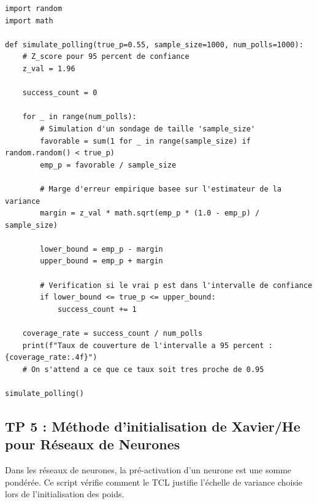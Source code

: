 \documentclass[11pt,a4paper]{article}
\begin{document}
\begin{lstlisting}
import random
import math

def simulate_polling(true_p=0.55, sample_size=1000, num_polls=1000):
    # Z_score pour 95 percent de confiance
    z_val = 1.96

    success_count = 0

    for _ in range(num_polls):
        # Simulation d'un sondage de taille 'sample_size'
        favorable = sum(1 for _ in range(sample_size) if random.random() < true_p)
        emp_p = favorable / sample_size

        # Marge d'erreur empirique basee sur l'estimateur de la variance
        margin = z_val * math.sqrt(emp_p * (1.0 - emp_p) / sample_size)

        lower_bound = emp_p - margin
        upper_bound = emp_p + margin

        # Verification si le vrai p est dans l'intervalle de confiance
        if lower_bound <= true_p <= upper_bound:
            success_count += 1

    coverage_rate = success_count / num_polls
    print(f"Taux de couverture de l'intervalle a 95 percent : {coverage_rate:.4f}")
    # On s'attend a ce que ce taux soit tres proche de 0.95

simulate_polling()
\end{lstlisting}


\vspace{1cm}
\subsection*{TP 5 : Méthode d'initialisation de Xavier/He pour Réseaux de Neurones}

Dans les réseaux de neurones, la pré-activation d'un neurone est une somme pondérée. Ce script vérifie comment le TCL justifie l'échelle de variance choisie lors de l'initialisation des poids.
\end{document}
